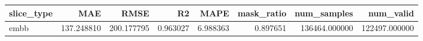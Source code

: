 \begin{tabular}{lrrrrrrr}
\toprule
slice_type & MAE & RMSE & R2 & MAPE & mask_ratio & num_samples & num_valid \\
\midrule
embb & 137.248810 & 200.177795 & 0.963027 & 6.988363 & 0.897651 & 136464.000000 & 122497.000000 \\
\bottomrule
\end{tabular}
